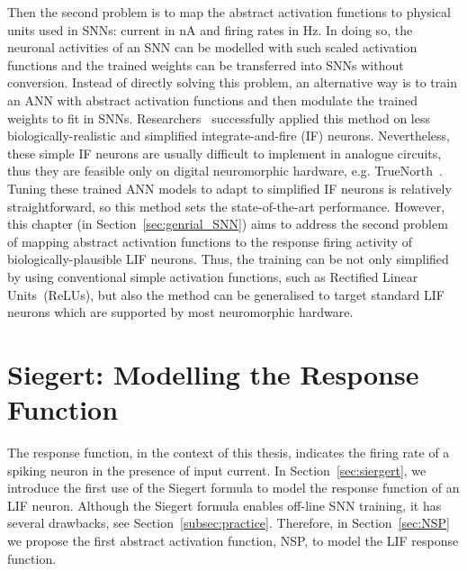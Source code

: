 	Then the second problem is to map the abstract activation functions to physical units used in SNNs: current in nA and firing rates in Hz.
	In doing so, the neuronal activities of an SNN can be modelled with such scaled activation functions and the trained weights can be transferred into SNNs without conversion.
	Instead of directly solving this problem, an alternative way is to train an ANN with abstract activation functions and then modulate the trained weights to fit in SNNs.
	Researchers~\citep{cao2015spiking,diehl2015fast} successfully applied this method on less biologically-realistic and simplified integrate-and-fire (IF) neurons.
	Nevertheless, these simple IF neurons are usually difficult to implement in analogue circuits, thus they are feasible only on digital neuromorphic hardware, e.g. TrueNorth~\citep{merolla2014million}.
	Tuning these trained ANN models to adapt to simplified IF neurons is relatively straightforward, so this method sets the state-of-the-art performance.
	However, this chapter (in Section~\ref{sec:genrial_SNN}) aims to address the second problem of mapping abstract activation functions to the response firing activity of biologically-plausible LIF neurons.
	Thus, the training can be not only simplified by using conventional simple activation functions, such as Rectified Linear Units~(ReLUs), but also the method can be generalised to target standard LIF neurons which are supported by most neuromorphic hardware.
	
	
	
\section{Siegert: Modelling the Response Function}
	\label{sec:response_func}
	The response function, in the context of this thesis, indicates the firing rate of a spiking neuron in the presence of input current.
	In Section~\ref{sec:siergert}, we introduce the first use of the Siegert formula to model the response function of an LIF neuron.
	Although the Siegert formula enables off-line SNN training, it has several drawbacks, see Section~\ref{subsec:practice}.
	Therefore, in Section~\ref{sec:NSP} we propose the first abstract activation function, NSP, to model the LIF response function.
	

